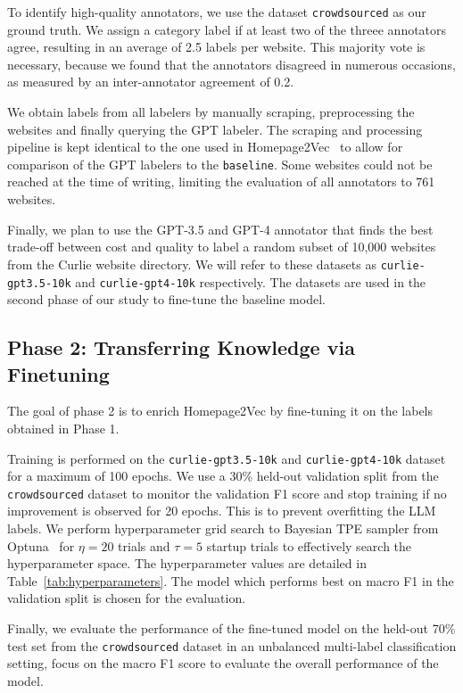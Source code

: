 To identify high-quality annotators, we use the dataset \texttt{crowdsourced} as our ground truth.   We assign a category label if at least two of the threee annotators agree, resulting in an average of 2.5 labels per website. This majority vote is necessary, because we found that the annotators disagreed in numerous occasions, as measured by an inter-annotator agreement of 0.2.

We obtain labels from all labelers by manually scraping, preprocessing the websites and finally querying the GPT labeler. The scraping and processing pipeline is kept identical to the one used in Homepage2Vec~\cite{homepage2vec} to allow for comparison of the GPT labelers to the \texttt{baseline}. Some websites could not be reached at the time of writing, limiting the evaluation of all annotators to 761 websites.

Finally, we plan to use the GPT-3.5 and GPT-4 annotator that finds the best trade-off between cost and quality to label a random subset of 10,000 websites from the Curlie website directory. We will refer to these datasets as \texttt{curlie-gpt3.5-10k} and \texttt{curlie-gpt4-10k} respectively. The datasets are used in the second phase of our study to fine-tune the baseline model.

\subsection{Phase 2: Transferring Knowledge via Finetuning}

The goal of phase 2 is to enrich Homepage2Vec by fine-tuning it on the labels obtained in Phase 1.

Training is performed on the \texttt{curlie-gpt3.5-10k} and \texttt{curlie-gpt4-10k} dataset for a maximum of 100 epochs. We use a 30\% held-out validation split from the \texttt{crowdsourced} dataset to monitor the validation F1 score and stop training if no improvement is observed for 20 epochs. This is to prevent overfitting the LLM labels. We perform hyperparameter grid search to Bayesian TPE sampler from Optuna~\cite{optuna} for $\eta=20$ trials and $\tau=5$ startup trials to effectively search the hyperparameter space. The hyperparameter values are detailed in Table~\ref{tab:hyperparameters}. The model which performs best on macro F1 in the validation split is chosen for the evaluation.



Finally, we evaluate the performance of the fine-tuned model on the held-out 70\% test set from the \texttt{crowdsourced} dataset in an unbalanced multi-label classification setting, focus on the macro F1 score to evaluate the overall performance of the model.
